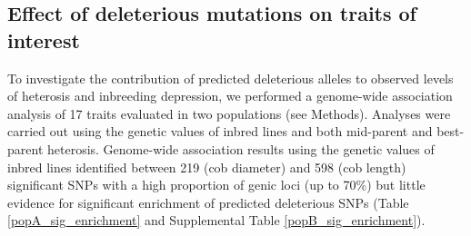 \documentclass[12pt]{article}
\begin{document}
\subsection*{Effect of deleterious mutations on traits of interest}

To investigate the contribution of predicted deleterious alleles to observed levels of heterosis and inbreeding depression, we performed a genome-wide association analysis of 17 traits evaluated in two populations (see Methods). Analyses were carried out using the genetic values of inbred lines and both mid-parent and best-parent heterosis. Genome-wide association results using the genetic values of inbred lines identified between 219 (cob diameter) and 598 (cob length) significant SNPs with a high proportion of genic loci (up to 70\%) but little evidence for significant enrichment of predicted deleterious SNPs (Table \ref{popA_sig_enrichment} and Supplemental Table \ref{popB_sig_enrichment}). 
\end{document}
